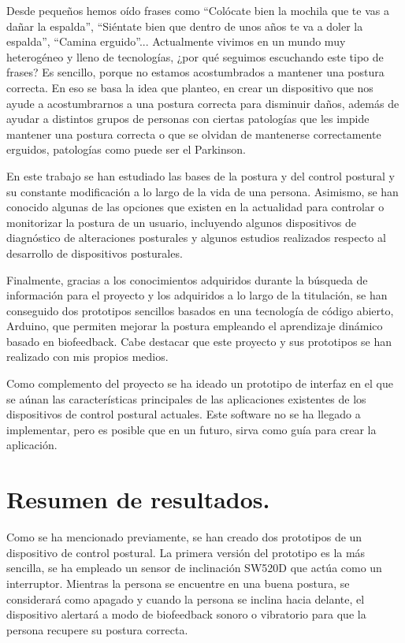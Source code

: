 
Desde pequeños hemos oído frases como ``Colócate bien la mochila que te vas a dañar la espalda'', ``Siéntate bien que dentro de unos años te va a doler la espalda'', ``Camina erguido''... Actualmente vivimos en un mundo muy heterogéneo y lleno de tecnologías, ¿por qué seguimos escuchando este tipo de frases? Es sencillo, porque no estamos acostumbrados a mantener una postura correcta. En eso se basa la idea que planteo, en crear un dispositivo que nos ayude a acostumbrarnos a una postura correcta para disminuir daños, además de ayudar a distintos grupos de personas con ciertas patologías que les impide mantener una postura correcta o que se olvidan de mantenerse correctamente erguidos, patologías como puede ser el Parkinson. 

En este trabajo se han estudiado las bases de la postura y del control postural y su constante modificación a lo largo de la vida de una persona. Asimismo, se han conocido algunas de las opciones que existen en la actualidad para controlar o monitorizar la postura de un usuario, incluyendo algunos dispositivos de diagnóstico de alteraciones posturales y algunos estudios realizados respecto al desarrollo de dispositivos posturales.

Finalmente, gracias a los conocimientos adquiridos durante la búsqueda de información para el proyecto y los adquiridos a lo largo de la titulación, se han conseguido dos prototipos sencillos basados en una tecnología de código abierto, Arduino, que permiten mejorar la postura empleando el aprendizaje dinámico basado en biofeedback. Cabe destacar que este proyecto y sus prototipos se han realizado con mis propios medios.

Como complemento del proyecto se ha ideado un prototipo de interfaz en el que se aúnan las características principales de las aplicaciones existentes de los dispositivos de control postural actuales. Este software no se ha llegado a implementar, pero es posible que en un futuro, sirva como guía para crear la aplicación.


\section{Resumen de resultados.}

Como se ha mencionado previamente, se han creado dos prototipos de un dispositivo de control postural. La primera versión del prototipo es la más sencilla, se ha empleado un sensor de inclinación SW520D que actúa como un interruptor. Mientras la persona se encuentre en una buena postura, se considerará como apagado y cuando la persona se inclina hacia delante, el dispositivo alertará a modo de biofeedback sonoro o vibratorio para que la persona recupere su postura correcta. 

